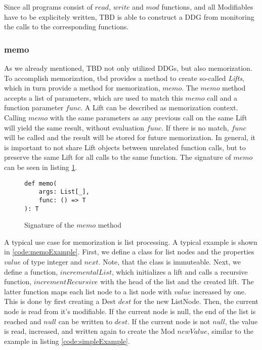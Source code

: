 Since all programs consist of $read$, $write$ and $mod$ functions, and all Modifiables have to be explicitely written, TBD is able to construct a DDG from monitoring the calls to the corresponding functions.

\subsubsection{memo}
As we already mentioned, TBD not only utilized DDGs, but also memorization. To accomplish memorization, tbd provides a method to create so-called \textit{Lifts}, which in turn provide a method for memorization, $memo$. The $memo$ method accepts a list of parameters, which are used to match this $memo$ call and a function parameter $func$. A Lift can be described as memorization context. Calling $memo$ with the same parameters as any previous call on the same Lift will yield the same result, without evaluation $func$. If there is no match, $func$ will be called and the result will be stored for future memorization. In general, it is important to not share Lift objects between unrelated function calls, but to preserve the same Lift for all calls to the same function. The signature of $memo$ can be seen in listing \ref{code:memo}.

\begin{figure}
\begin{lstlisting}[frame=single,basicstyle=\ttfamily]
def memo(
    args: List[_], 
    func: () => T
): T
\end{lstlisting}
\caption{Signature of the $memo$ method}
\label{code:memo}
\end{figure}

A typical use case for memorization is list processing. A typical example is shown in \ref{code:memoExample}. First, we define a class for list nodes and the properties $value$ of type integer and $next$. Note, that the class is immuteable. Next, we define a function, $incrementalList$, which initializes a lift and calls a recursive function, $incrementRecursive$ with the head of the list and the created lift. The latter function maps each list node to a list node with $value$ increased by one. This is done by first creating a Dest $dest$ for the new ListNode. Then, the current node is read from it's modifiable. If the current node is null, the end of the list is reached and $null$ can be written to $dest$. If the current node is not $null$, the value is read, increased, and written again to create the Mod $newValue$, similar to the example in listing \ref{code:simpleExample}. 

